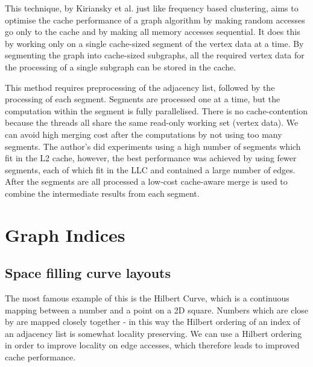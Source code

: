 This technique, by Kiriansky et al. just like frequency based clustering, aims to optimise the cache performance of a graph algorithm by making random accesses go only to the cache and by making all memory accesses sequential. It does this by working only on a single cache-sized segment of the vertex data at a time. By segmenting the graph into cache-sized subgraphs, all the required vertex data for the processing of a single subgraph can be stored in the cache.

This method requires preprocessing of the adjacency list, followed by the processing of each segment. Segments are processed one at a time, but the computation within the segment is fully parallelised. There is no cache-contention because the threads all share the same read-only working set (vertex data). We can avoid high merging cost after the computations by not using too many segments. The author's did experiments using a high number of segments which fit in the L2 cache, however, the best performance was achieved by using fewer segments, each of which fit in the LLC and contained a large number of edges. After the segments are all processed a low-cost cache-aware merge is used to combine the intermediate results from each segment.

\section{Graph Indices}

\subsection{Space filling curve layouts}

The most famous example of this is the Hilbert Curve, which is a continuous mapping between a number and a point on a 2D square. Numbers which are close by are mapped closely together - in this way the Hilbert ordering of an index of an adjacency list is somewhat locality preserving. We can use a Hilbert ordering in order to improve locality on edge accesses, which therefore leads to improved cache performance.
